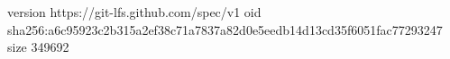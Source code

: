 version https://git-lfs.github.com/spec/v1
oid sha256:a6c95923c2b315a2ef38c71a7837a82d0e5eedb14d13cd35f6051fac77293247
size 349692
